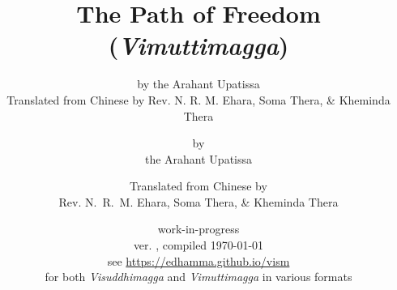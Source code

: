 

\def\thepageIssue{\href{https://github.com/edhamma/vism/issues/new?title=Vimuttimagga\%20issue\%20at\%20page\%20\thepage\&body=(\vismCommitTimestampQuery)}{\thepage}}
\def\vismAssertFootnoteCounter#1{\relax}
\usepackage[stable]{footmisc}



	\title{The Path of Freedom \\ (\emph{Vimuttimagga})}
	\date{work-in-progress \\ ver. \vismCommitHref, compiled \today \\ see \url{https://edhamma.github.io/vism} \\ for both \emph{Visuddhimagga} and \emph{Vimuttimagga} in various formats}
	\ifplastex
		\author{by the Arahant Upatissa \\ Translated from Chinese by Rev. N. R. M. Ehara, Soma Thera, \& Kheminda Thera}
	\else
		\author{by \\ the Arahant Upatissa \and Translated from Chinese by \\ Rev. N.~R.~M. Ehara, Soma Thera, \& Kheminda Thera}
	\fi
	\maketitle

	\frontmatter
		\bgroup
			\ifplastex\else\renewcommand{\baselinestretch}{0.2}\normalsize\fi
			\tableofcontents
		\egroup
		


